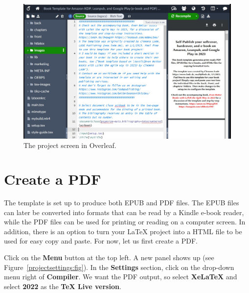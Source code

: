 \begin{figure}[H]\centering
\includegraphics[width=\textwidth]{images/overleaf.jpg}
\caption{The project screen in Overleaf.}
\label{overleaf:fig}
\end{figure}



\section{Create a PDF}\label{createpdfoutput:sec}

The template is set up to produce both EPUB and PDF files. The EPUB files can later be converted into formats that can be read by a Kindle e-book reader, while the PDF files can be used for printing or reading on a computer screen. In addition, there is an option to turn your LaTeX project into a HTML file to be used for easy copy and paste. For now, let us first create a PDF.

Click on the \textbf{Menu} button at the top left. A new panel shows up (see Figure~\ref{projectsettings:fig}). In the \textbf{Settings} section, click on the drop-down menu right of \textbf{Compiler}. We want the PDF output, so select \textbf{XeLaTeX} and select \textbf{2022} as the \textbf{TeX Live version}.

